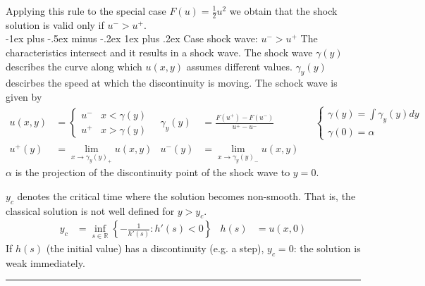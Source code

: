 \documentclass[10pt,landscape]{article}
\makeatletter
\renewcommand{\subsubsection}{\@startsection{subsubsection}{3}{0mm}%
                                {-1ex plus -.5ex minus -.2ex}%
                                {1ex plus .2ex}%
                                {\normalfont\small\bfseries}}
\makeatother
\begin{document}
\begin{multicols}{2}
Applying this rule to the special case $F(u)=\frac{1}{2}u^2$ we obtain that the shock solution is valid only if $u^- > u^+$.
\\
\subsubsection{Case shock wave: $u^- > u^+$} 
The characteristics intersect and it results in a shock wave. The shock wave $\gamma(y)$ describes the curve along which $u(x,y)$ assumes different values. $\gamma_y(y)$ descirbes the speed at which the discontinuity is moving.  The schock wave is given by
\begin{align*}
  u(x,y) &= \begin{cases} u^- & x < \gamma(y) \\ u^+ & x > \gamma(y) \end{cases} &
  \gamma_y(y) &= \frac{F(u^+) - F(u^-)}{u^+-u^-} &
  &\begin{cases} \gamma(y) = \int \gamma_y(y)dy \\ \gamma(0) = \alpha \end{cases} \\
  u^+(y) &= \lim_{x \to \gamma_y(y)_+} u(x,y) & u^-(y) &= \lim_{x \to \gamma_y(y)_-} u(x,y)
\end{align*}
$\alpha$ is the projection of the discontinuity point of the shock wave to $y = 0$.

$y_c$ denotes the critical time where the solution becomes non-smooth. That is, the classical solution is not well defined for $y>y_c$.
\begin{align*}
  y_c &= \inf_{s \in \mathbb{R}} \left\{ -\frac{1}{h'(s)} : h'(s) < 0 \right\} &
  h(s) &= u(x,0)
\end{align*}
If $h(s)$ (the initial value) has a discontinuity (e.g. a step), $y_c = 0$: the solution is weak immediately.


\clearpage

\rule{0.3\linewidth}{0.25pt}
%
%
\end{multicols}
\end{document}

